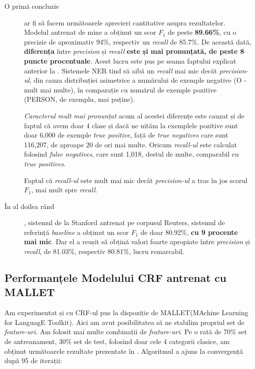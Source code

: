 \begin{description}

\item[O primă concluzie] ar fi să facem următoarele aprecieri cantitative asupra rezultatelor. Modelul antrenat de mine a obținut un scor \textbf{$F_1$} de peste \textbf{89.66\%}, cu o precizie de aproximativ 94\%, respectiv un \textit{recall} de 85.7\%.  De această dată, \textbf{diferența} între \textit{precision} și \textit{recall}\textbf{ este și mai pronunțată, de peste 8 puncte procentuale}. Acest lucru este pus pe seama faptului explicat anterior la . Sistemele NER tind să aibă un \textit{recall} mai mic decăt \textit{precision-ul}, din cauza distribuției asimetrice a numărului de exemple negative (O - mult mai multe), în comparație cu numărul de exemple pozitive (PERSON, de exemplu, mai puține). 

\textit{Caracterul mult mai pronunțat} acum al acestei diferențe este cauzat și de faptul că avem doar 4 clase și dacă ne uităm la exemplele pozitive sunt doar 6,000 de exemple \textit{true positive}, față de \textit{true negatives} care sunt 116,207, de aproape 20 de ori mai multe. Oricum \textit{recall-ul} este calculat folosind \textit{false negatives}, care sunt 1,018, destul de multe, comparabil cu \textit{true positives}.

Faptul că \textit{recall-ul} este mult mai mic decât \textit{precision-ul} a tras în jos scorul $F_1$, mai mult spre \textit{recall}.

\item[În al doilea rând], sistemul de la Stanford antrenat pe corpusul Reuters, sistemul de referință \textit{baseline} a obținut un scor $F_1$ de doar 80.92\%, \textbf{cu 9 procente mai mic}. Dar el a reușit să obțină  valori foarte apropiate între \textit{precision} și \textit{recall}, de 81.03\%, respectiv 80.81\%, lucru remarcabil.

\end{description}

\subsection{Performanțele Modelului CRF antrenat cu MALLET}

Am experimentat și cu CRF-ul pus la dispoziție de MALLET(MAchine Learning for LanguagE Toolkit). Aici am avut posibilitatea să ne stabilim propriul set de \textit{feature-uri}. Am folosit mai multe combinații de \textit{feature-uri}. Pe o rată de 70\% set de antreanament, 30\% set de test, folosind doar cele 4 categorii clasice, am obținut următoarele rezultate prezentate în . Algoritmul a ajuns la convergență după 95 de iterații:

